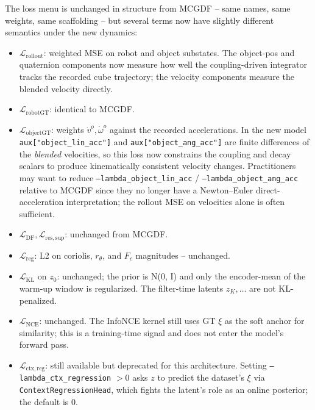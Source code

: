 \documentclass[11pt]{article}
\begin{document}
The loss menu is unchanged in structure from MCGDF -- same names,
same weights, same scaffolding -- but several terms now have
slightly different semantics under the new dynamics:
\begin{itemize}
  \item $\mathcal{L}_{\mathrm{rollout}}$: weighted MSE on robot and
    object substates.  The object-pos and quaternion components now
    measure how well the coupling-driven integrator tracks the
    recorded cube trajectory; the velocity components measure the
    blended velocity directly.
  \item $\mathcal{L}_{\mathrm{robotGT}}$: identical to MCGDF.
  \item $\mathcal{L}_{\mathrm{objectGT}}$: weights $\dot v^o, \dot\omega^o$
    against the recorded accelerations.  In the new model
    \texttt{aux["object\_lin\_acc"]} and
    \texttt{aux["object\_ang\_acc"]} are finite differences of the
    \emph{blended} velocities, so this loss now constrains the
    coupling and decay scalars to produce kinematically consistent
    velocity changes.  Practitioners may want to reduce
    \texttt{--lambda\_object\_lin\_acc} / \texttt{--lambda\_object\_ang\_acc}
    relative to MCGDF since they no longer have a Newton--Euler
    direct-acceleration interpretation; the rollout MSE on velocities
    alone is often sufficient.
  \item $\mathcal{L}_{\mathrm{DF}}, \mathcal{L}_{\mathrm{res,sup}}$:
    unchanged from MCGDF.
  \item $\mathcal{L}_{\mathrm{reg}}$: L2 on coriolis, $r_\theta$,
    and $F_c$ magnitudes -- unchanged.
  \item $\mathcal{L}_{\mathrm{KL}}$ on $z_0$: unchanged; the prior
    is N(0, I) and only the encoder-mean of the warm-up window is
    regularized.  The filter-time latents $z_K, \dots$ are not
    KL-penalized.
  \item $\mathcal{L}_{\mathrm{NCE}}$: unchanged.  The InfoNCE kernel
    still uses GT $\xi$ as the soft anchor for similarity; this is a
    training-time signal and does not enter the model's forward
    pass.
  \item $\mathcal{L}_{\mathrm{ctx,reg}}$: still available but
    deprecated for this architecture.  Setting
    \texttt{--lambda\_ctx\_regression} $>0$ asks $z$ to predict the
    dataset's $\xi$ via \texttt{ContextRegressionHead}, which fights
    the latent's role as an online posterior; the default is $0$.
\end{itemize}
\end{document}
